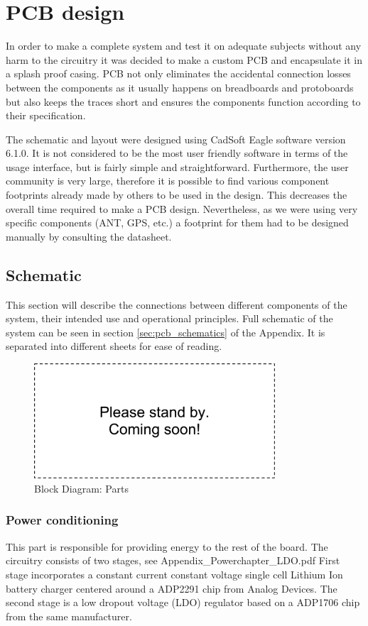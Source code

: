 \chapter{PCB design}
In order to make a complete system and test it on adequate subjects without any harm to the circuitry it was decided to make a custom PCB and encapsulate it in a splash proof casing. PCB not only eliminates the accidental connection losses between the components as it usually happens on breadboards and protoboards but also keeps the traces short and ensures the components function according to their specification.
 
The schematic and layout were designed using CadSoft Eagle software version 6.1.0. It is not considered to be the most user friendly software in terms of the usage interface, but is fairly simple and straightforward. Furthermore, the user community is very large, therefore it is possible to find various component footprints already made by others to be used in the design. This decreases the overall time required to make a PCB design. Nevertheless, as we were using very specific components  (ANT, GPS, etc.) a footprint for them had to be designed manually by consulting the datasheet. 


\section{Schematic}
This section will describe the connections between different components of the system, their intended use and operational principles. Full schematic of the system can be seen in section \ref{sec:pcb_schematics} of the Appendix. It is separated into different sheets for ease of reading.
 
\begin{figure}
\centering
\includegraphics[width=0.8\textwidth]{Images/dummy}
\caption{Block Diagram: Parts}
\label{fig:block_parts}
\end{figure}

\subsection{Power conditioning}
This part is responsible for providing energy to the rest of the board. The circuitry consists of two stages, see \TODO{}Appendix\_Powerchapter\_LDO.pdf First stage incorporates a constant current constant voltage single cell Lithium Ion battery charger centered around a ADP2291 chip from Analog Devices. The second stage is a low dropout voltage (LDO) regulator based on a ADP1706 chip from the same manufacturer.



